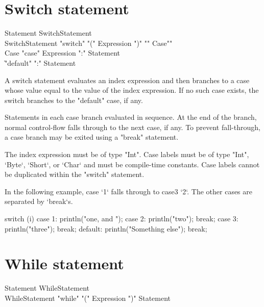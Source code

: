 \section{Switch statement}

\begin{grammar}
Statement \: SwitchStatement \\
SwitchStatement \: \xcd"switch" \xcd"(" Expression \xcd")" \xcd"{" Case\plus \xcd"}" \\
Case \: \xcd"case" Expression \xcd":" Statement\star \\
     \| \xcd"default" \xcd":" Statement\star \\
\end{grammar}

A switch statement evaluates an index expression and then branches to
a case whose value equal to the value of the index expression.
If no such case exists, the switch branches to the 
\xcd"default" case, if any.

Statements in each case branch evaluated in sequence.  At the
end of the branch, normal control-flow falls through to the next case, if
any.  To prevent fall-through, a case branch may be exited using
a \xcd"break" statement.

The index expression must be of type \xcd"Int".
Case labels must be of type \xcd"Int", \xcd`Byte`, \xcd`Short`, or \xcd`Char`
and must be compile-time 
constants.  Case labels cannot be duplicated within the
\xcd"switch" statement.

In the following example, case \xcd`1` falls through to case3 \xcd`2`.  The
other cases are separated by \xcd`break`s.
\begin{xten}
switch (i) {
  case 1: println("one, and ");
  case 2: println("two"); 
          break;
  case 3: println("three");
          break;
  default: println("Something else");
           break;
}
\end{xten}


\section{While statement}

\begin{grammar}
Statement \: WhileStatement \\
WhileStatement \: \xcd"while" \xcd"(" Expression \xcd")" Statement \\
\end{grammar}

